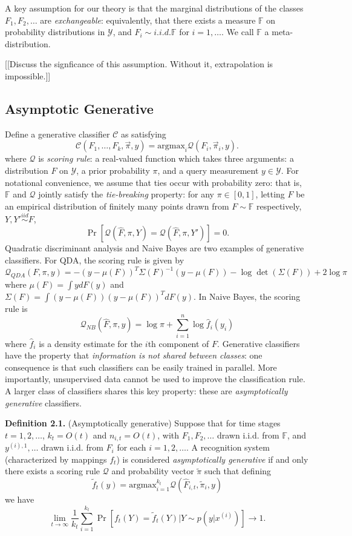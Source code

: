 \documentclass{article}
\newcommand{\argmax}{\text{argmax}}
\begin{document}
A key assumption for our theory is that the marginal distributions of
the classes $F_1, F_2, \hdots$ are \emph{exchangeable}: equivalently,
that there exists a measure $\mathbb{F}$ on probability distributions
in $\mathcal{Y}$, and $F_i \sim{i.i.d.} \mathbb{F}$ for $i =
1,\hdots$.  We call $\mathbb{F}$ a meta-distribution.

[[Discuss the signficance of this assumption.  Without it, extrapolation is impossible.]]

\subsection{Asymptotic Generative}

Define a generative classifier $\mathcal{C}$ as satisfying
 \[
\mathcal{C}(F_1,\hdots, F_k, \vec{\pi}, y) = \argmax_i \mathcal{Q}(F_i, \vec{\pi}_i, y).
\]
where $\mathcal{Q}$ is \emph{scoring rule}: a real-valued function
which takes three arguments: a distribution $F$ on $\mathcal{Y}$, a
prior probability $\pi$, and a query measurement $y \in \mathcal{Y}$.
For notational convenience, we assume that ties occur with probability
zero: that is, $\mathbb{F}$ and $\mathcal{Q}$ jointly satisfy the
\emph{tie-breaking} property: for any $\pi \in [0,1]$, letting
$\hat{F}$ be an empirical distribution of finitely many points drawn
from $F \sim \mathbb{F}$ respectively, $Y, Y' \stackrel{iid}{\sim} F$,
\begin{equation}\label{eq:tie}
\Pr[\mathcal{Q}(\hat{F}, \pi, Y) = \mathcal{Q}(\hat{F}, \pi, Y')] = 0.
\end{equation}
Quadratic discriminant analysis and Naive Bayes are two examples of
generative classifiers.  For QDA, the scoring rule is given by
\[
\mathcal{Q}_{QDA}(F, \pi, y) = -(y - \mu(F))^T \Sigma(F)^{-1} (y-\mu(F)) - \log\det(\Sigma(F)) + 2\log\pi
\]
where $\mu(F) = \int y dF(y)$ and $\Sigma(F) = \int (y-\mu(F))(y-\mu(F))^T dF(y)$.
In Naive Bayes, the scoring rule is
\[
\mathcal{Q}_{NB}(\hat{F}, \pi, y) = \log\pi + \sum_{i=1}^n \log \hat{f}_i(y_i)
\]
where $\hat{f}_i$ is a density estimate for the $i$th component of
$F$.  Generative classifiers have the property that \emph{information
  is not shared between classes}: one consequence is that such
classifiers can be easily trained in parallel.  More importantly,
unsupervised data cannot be used to improve the classification rule.
A larger class of classifiers shares this key property: these are
\emph{asymptotically generative} classifiers.


\textbf{Definition 2.1.}  (Asymptotically generative) Suppose that for
time stages $t = 1,2,\hdots$, $k_t = O(t)$ and $n_{i,t} = O(t)$, with
$F_1,F_2,\hdots$ drawn i.i.d. from $\mathbb{F}$, and
$y^{(i),1},\hdots$ drawn i.i.d. from $F_i$ for each $i = 1,2,\hdots$.
A recognition system (characterized by mappings $f_t$) is considered
\emph{asymptotically generative} if and only there exists a scoring
rule $\mathcal{Q}$ and probability vector $\tilde{\pi}$ such that
defining
\[
\tilde{f}_t(y) = \argmax_{i=1}^{k_t} \mathcal{Q}(\hat{F}_{i, t}, \tilde{\pi}_i, y)
\]
we have
\[
\lim_{t \to \infty} \frac{1}{k_t} \sum_{i=1}^{k_t}\Pr[f_t(Y) = \tilde{f}_t(Y) | Y \sim p(y|x^{(i)})] \to 1.
\]
\end{document}
